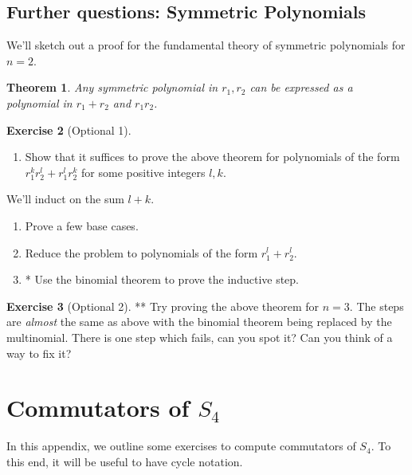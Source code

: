 \documentclass[reqno, 12pt, letter]{article}
\theoremstyle{plain}
\newtheorem{theorem}{Theorem}[section]
\theoremstyle{definition}
\newtheorem{exercise}[theorem]{Exercise}
\theoremstyle{remark}
\numberwithin{equation}{section}
\begin{document}
\subsection{Further questions: Symmetric Polynomials}
We'll sketch out a proof for the fundamental theory of symmetric polynomials for $ n=2$.
	\begin{theorem}
		\label{theorem:fundamental_theorem_symmetric_polynomials}
		Any symmetric polynomial in $ r_1, r_2$ can be expressed as a polynomial in $ r_1 + r_2$ and $r_1 r_2$. 
	\end{theorem}
	\begin{exercise}[Optional 1]
		\begin{enumerate}
			\item Show that it suffices to prove the above theorem for polynomials of the form $ r_1^k r_2^l + r_1^l r_2^k$ for some positive integers $l,k$.
		\end{enumerate}
		We'll induct on the sum $ l+k$.
		\begin{enumerate}[resume]
			\item Prove a few base cases.
			\item Reduce the problem to polynomials of the form $ r_1^l + r_2^l$.
			\item* Use the binomial theorem to prove the inductive step.
		\end{enumerate}
	\end{exercise}
	
	\begin{exercise}[Optional 2] **
		Try proving the above theorem for $ n=3$. The steps are \emph{almost} the same as above with the binomial theorem being replaced by the multinomial. There is one step which fails, can you spot it? Can you think of a way to fix it?
	\end{exercise}



\newpage
\appendix
\section{Commutators of $S_4$}
\label{appendix:commutators-s4}
In this appendix, we outline some exercises to compute commutators of $S_4$.
To this end, it will be useful to have cycle notation.
\end{document}
